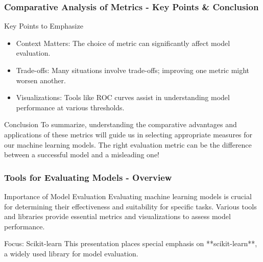 \documentclass[aspectratio=169]{beamer}
\begin{document}
\begin{frame}[fragile]
    \frametitle{Comparative Analysis of Metrics - Key Points & Conclusion}
    \begin{block}{Key Points to Emphasize}
        \begin{itemize}
            \item Context Matters: The choice of metric can significantly affect model evaluation. 
            \item Trade-offs: Many situations involve trade-offs; improving one metric might worsen another.
            \item Visualizations: Tools like ROC curves assist in understanding model performance at various thresholds.
        \end{itemize}
    \end{block}

    \begin{block}{Conclusion}
        To summarize, understanding the comparative advantages and applications of these metrics will guide us in selecting appropriate measures for our machine learning models. The right evaluation metric can be the difference between a successful model and a misleading one!
    \end{block}
\end{frame}

\begin{frame}[fragile]
    \frametitle{Tools for Evaluating Models - Overview}
    \begin{block}{Importance of Model Evaluation}
        Evaluating machine learning models is crucial for determining their effectiveness and suitability for specific tasks. Various tools and libraries provide essential metrics and visualizations to assess model performance.
    \end{block}
    \begin{block}{Focus: Scikit-learn}
        This presentation places special emphasis on **scikit-learn**, a widely used library for model evaluation.
    \end{block}
\end{frame}
\end{document}
